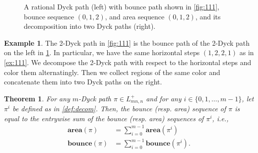 \documentclass[12pt,reqno]{amsart}
\newtheorem{thm}{Theorem}
\theoremstyle{definition}
\newtheorem{example}{Example}
\newcommand{\aarea}{\mathbf{area}}
\newcommand{\bbounce}{\mathbf{bounce}}
\begin{document}
\begin{figure}[H]
\hspace{1cm}
\caption{A rational Dyck path (left) with bounce path shown in \cref{fig:111}, bounce sequence $(0,1,2)$, and area sequence $(0,1,2)$, and its decomposition into two Dyck paths (right).}
\label{fig:decomp}
\end{figure}

\begin{example}
The 2-Dyck path in \cref{fig:111} is the bounce path of the 2-Dyck path on the left in \cref{fig:decomp}. In particular, we have the same horizontal steps $(1,2,2,1)$ as in \cref{ex:111}. We decompose the 2-Dyck path with respect to the horizontal steps and color them alternatingly. Then we collect regions of the same color and concatenate them into two Dyck paths on the right.
\end{example}

\begin{thm}\label{thm:decomp}
For any $m$-Dyck path $\pi \in L_{mn,n}^+$ and for any $i \in \{0,1,\dots,m-1\}$, let $\pi^i$ be defined as in \cref{def:decom}.
Then, the bounce (resp. area) sequence of $\pi$ is equal to the entrywise sum of the bounce (resp. area) sequences of $\pi^i$, i.e.,
\begin{align}
\aarea(\pi) &= \sum_{i=0}^{m-1} \aarea(\pi^i) \\
\bbounce(\pi) &= \sum_{i=0}^{m-1} \bbounce(\pi^i).
\end{align}
\end{thm}
\end{document}
